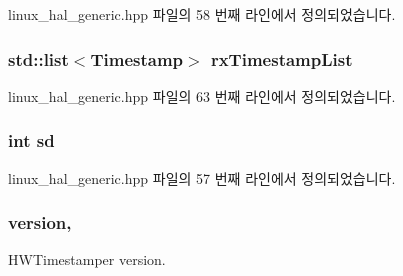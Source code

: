 linux\+\_\+hal\+\_\+generic.\+hpp 파일의 58 번째 라인에서 정의되었습니다.

\subsubsection[{\texorpdfstring{rx\+Timestamp\+List}{rxTimestampList}}]{\setlength{\rightskip}{0pt plus 5cm}std\+::list$<${\bf Timestamp}$>$ rx\+Timestamp\+List\hspace{0.3cm}{\ttfamily [private]}}\hypertarget{class_linux_timestamper_generic_a3ab5f699ce3a90c21782087bdae99de9}{}\label{class_linux_timestamper_generic_a3ab5f699ce3a90c21782087bdae99de9}


linux\+\_\+hal\+\_\+generic.\+hpp 파일의 63 번째 라인에서 정의되었습니다.

\subsubsection[{\texorpdfstring{sd}{sd}}]{\setlength{\rightskip}{0pt plus 5cm}int sd\hspace{0.3cm}{\ttfamily [private]}}\hypertarget{class_linux_timestamper_generic_a06b0afe769d54ae94259d8532bc878b0}{}\label{class_linux_timestamper_generic_a06b0afe769d54ae94259d8532bc878b0}


linux\+\_\+hal\+\_\+generic.\+hpp 파일의 57 번째 라인에서 정의되었습니다.

\subsubsection[{\texorpdfstring{version}{version}}]{ version\hspace{0.3cm}{\ttfamily [protected]}, {\ttfamily [inherited]}}\hypertarget{class_common_timestamper_ab22abc2906422da61885ac6c8e6a1a59}{}\label{class_common_timestamper_ab22abc2906422da61885ac6c8e6a1a59}


H\+W\+Timestamper version. 



